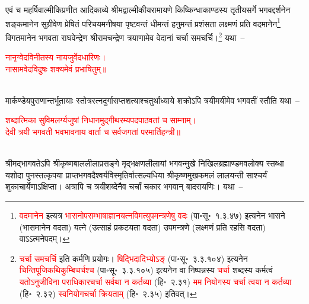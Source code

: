 \begin{sloppypar}\justifying\noindent\hspace{10mm} एवं च महर्षि\-वाल्मीकि\-प्रणीत आदि\-काव्ये श्रीमद्वाल्मीकीय\-रामायणे किष्किन्धा\-काण्डस्य तृतीय\-सर्गे भगवद्दर्शनेन शङ्कमानेन सुग्रीवेण प्रेषितं परिचय\-मनीषया पृष्टवन्तं धीमन्तं हनुमन्तं प्रशंसता लक्ष्मणं प्रति वदमानेन\footnote{\textcolor{red}{वदमानेन} इत्यत्र \textcolor{red}{भासनोप\-सम्भाषा\-ज्ञान\-यत्न\-विमत्युपमन्त्रणेषु वदः} (पा॰सू॰~१.३.४७) इत्यनेन भासने (भासमानेन वदता) यत्ने (उत्साहं प्रकटयता वदता) उपमन्त्रणे (लक्ष्मणं प्रति रहसि वदता) वाऽऽत्मनेपदम्।} विगत\-मानेन भगवता राघवेन्द्रेण श्रीरामचन्द्रेण त्रयाणामेव वेदानां 
चर्चा समचर्चि।\footnote{\textcolor{red}{चर्चा समचर्चि} इति कर्मणि प्रयोगः। \textcolor{red}{षिद्भिदादिभ्योऽङ्} (पा॰सू॰~३.३.१०४) इत्यनेन \textcolor{red}{चिन्ति\-पूजि\-कथि\-कुम्बि\-चर्चश्च} (पा॰सू॰~३.३.१०५) इत्यनेन वा निष्पन्नस्य \textcolor{red}{चर्चा} शब्दस्य कर्मत्वं \textcolor{red}{यतोऽनुजीविना पराधिकारचर्चा सर्वथा न कर्तव्या} (हि॰~२.३१) \textcolor{red}{मम नियोगस्य चर्चा त्वया न कर्तव्या} (हि॰~२.३२) \textcolor{red}{स्वनियोगचर्चा क्रियताम्} (हि॰~२.३५) इतिवत्।} यथा~–\end{sloppypar}
\centering\textcolor{red}{नानृग्वेदविनीतस्य नायजुर्वेदधारिणः।\nopagebreak\\
नासामवेदविदुषः शक्यमेवं प्रभाषितुम्॥}\nopagebreak\\
\\
\begin{sloppypar}\justifying\noindent\hspace{10mm} मार्कण्डेय\-पुराणान्तर्भूतायाः स्तोत्र\-रत्न\-दुर्गा\-सप्तशत्याश्चतुर्थाध्याये शक्रोऽपि त्रयीमयीमेव भगवतीं स्तौति यथा~–\end{sloppypar}
\centering\textcolor{red}{शब्दात्मिका सुविमलर्ग्यजुषां निधानमुद्गीथरम्यपदपाठवतां च साम्नाम्। \nopagebreak\\
देवी त्रयी भगवती भवभावनाय वार्ता च सर्वजगतां परमार्तिहन्त्री॥}\nopagebreak\\
\\
\begin{sloppypar}\justifying\noindent\hspace{10mm} श्रीमद्भागवतेऽपि श्रीकृष्ण\-बाल\-लीला\-प्रसङ्गे मृद्भक्षण\-लीलायां भगवन्मुखे निखिल\-ब्रह्माण्डमवलोक्य स्तब्धा यशोदा पुनस्तत्कृपया प्राप्त\-भगवदैश्वर्य\-विस्मृतिर्वात्सल्य\-धिया श्रीकृष्ण\-मुख\-कमलं लालयन्ती साश्चर्यं शुकाचार्येणाऽक्षिप्ता। अत्रापि च त्रयीशब्देनैव चर्चां चकार भगवान् बादरायणिः। यथा~–\end{sloppypar}
